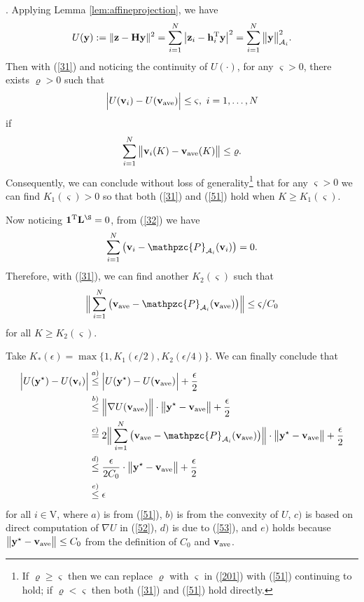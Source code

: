 \documentclass[a4paper, 11pt]{article}
\def\T{^{\rm\tiny T}}
\begin{document}
. Applying Lemma \ref{lem:affineprojection}, we have \begin{align}\label{52}
U(\mathbf{y}):=\|\mathbf{z}-\mathbf{H}\mathbf{y}\|^2= \sum_{i=1}^N \big|\mathbf{z}_i-\mathbf{h}_i\T \mathbf{y}\big|^2=\sum_{i=1}^N \big\|\mathbf{y}\big\|_{\mathcal{A}_i}^2.
\end{align}
Then with (\ref{31}) and noticing  the continuity of  $U(\cdot)$, for any $\varsigma>0$, there exists $\varrho>0$ such that
\begin{align}\label{51}
\Big|U( \mathbf{v}_i) - U(\mathbf{v}_{\rm ave})\Big|\leq \varsigma,\ i=1,\dots,N
\end{align}
if
\begin{align}\label{201}
\sum_{i=1}^N \big\|\mathbf{v}_i(K) -\mathbf{v}_{\rm ave}(K)\big\| \leq \varrho.
\end{align}
 Consequently, we can conclude without loss of generality\footnote{If $\varrho \geq \varsigma$ then we can replace $\varrho$ with $\varsigma$ in (\ref{201}) with (\ref{51}) continuing to hold; if $\varrho < \varsigma$ then both (\ref{31}) and (\ref{51}) hold directly. } that for any $\varsigma>0$ we can find $K_1(\varsigma)>0 $ so that both  (\ref{31}) and (\ref{51})  hold when  $K\geq K_1(\varsigma)$.

Now noticing $\mathbf{1}\T\mathbf{L}^\S=0$, from (\ref{32}) we have
\begin{align}
\sum_{i=1}^N\big(\mathbf{v}_i-\mathpzc{P}_{\mathcal{A}_i}(\mathbf{v}_i)\big)=0.
\end{align}
Therefore, with (\ref{31}), we can find another $K_2(\varsigma)$ such that
\begin{align}\label{53}
\Big\|\sum_{i=1}^N\big(\mathbf{v}_{\rm ave}-\mathpzc{P}_{\mathcal{A}_i}(\mathbf{v}_{\rm ave})\big)\Big\|\leq \varsigma/C_0
\end{align}
for all $K\geq K_2(\varsigma) $.

Take $K_\ast(\epsilon)=\max\{1,K_1(\epsilon/2),K_2(\epsilon/4) \}$. We can finally conclude that
\begin{align}
\Big|U(\mathbf{y}^\star) - U(\mathbf{v}_i)\Big|&\stackrel{a)}{\leq} \Big|U(\mathbf{y}^\star) - U(\mathbf{v}_{\rm ave})\Big|+\frac{\epsilon}{2} \nonumber\\
&\stackrel{b)}{\leq}\Big\| \nabla U(\mathbf{v}_{\rm ave})\Big\|\cdot \big\|\mathbf{y}^\star-\mathbf{v}_{\rm ave}\big\|+\frac{\epsilon}{2}\nonumber\\
&\stackrel{c)}{=}2\Big\| \sum_{i=1}^N\big(\mathbf{v}_{\rm ave}-\mathpzc{P}_{\mathcal{A}_i}(\mathbf{v}_{\rm ave})\big) \Big\|\cdot \big\|\mathbf{y}^\star-\mathbf{v}_{\rm ave}\big\|+\frac{\epsilon}{2}\nonumber\\
&\stackrel{d)}{\leq}\frac{\epsilon}{2C_0} \cdot \big\|\mathbf{y}^\star-\mathbf{v}_{\rm ave}\big\|+\frac{\epsilon}{2}\nonumber\\
&\stackrel{e)}{\leq}{\epsilon}
\end{align}
for all $i\in\mathrm{V}$, where $a)$ is from (\ref{51}), $b)$ is from the convexity of $U$, $c)$ is based on direct computation of $\nabla U$ in (\ref{52}), $d)$ is due to (\ref{53}), and $e)$ holds because $\big\|\mathbf{y}^\star-\mathbf{v}_{\rm ave}\big\|\leq C_0$ from the definition of $C_0$ and $\mathbf{v}_{\rm ave}$.
\end{document}
